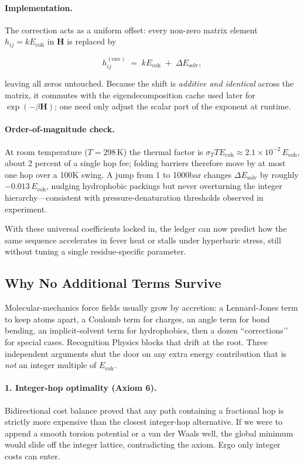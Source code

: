 \documentclass[11pt]{article}
\newcommand{\Eoh}{E_{\mathrm{coh}}}          %
\begin{document}
\paragraph{Implementation.}
The correction acts as a uniform offset:
every non-zero matrix element \(h_{ij}=k\Eoh\) in $\mathbf H$ is replaced by

\[
h_{ij}^{(\text{env})}
\;=\;
k\Eoh \;+\; \Delta E_{\text{solv}},
\]

leaving all zeros untouched.  Because the shift is \emph{additive and
identical} across the matrix, it commutes with the eigendecomposition
cache used later for $\exp(-\beta\mathbf H)$; one need only adjust the
scalar part of the exponent at runtime.

\paragraph{Order-of-magnitude check.}
At room temperature ($T=298\,\text{K}$) the thermal factor is
$\sigma_{T}T\Eoh\approx2.1\times10^{-2}\,\Eoh$, about 2 percent of a single
hop fee; folding barriers therefore move by at most one hop over a
100K swing. A jump from 1 to 1000bar changes
$\Delta E_{\text{solv}}$ by roughly $-0.013\,\Eoh$, nudging hydrophobic
packings but never overturning the integer hierarchy—consistent with
pressure-denaturation thresholds observed in experiment.

With these universal coefficients locked in, the ledger can now predict
how the same sequence accelerates in fever heat or stalls under
hyperbaric stress, still without tuning a single residue-specific
parameter.

\subsection{Why No Additional Terms Survive}\label{sec:no-extras}

Molecular-mechanics force fields usually grow by accretion: a Lennard-Jones
term to keep atoms apart, a Coulomb term for charges, an angle term for
bond bending, an implicit-solvent term for hydrophobics, then a dozen
“corrections’’ for special cases.  Recognition Physics blocks that drift
at the root.  Three independent arguments shut the door on any extra
energy contribution that is \emph{not} an integer multiple of \(\Eoh\).

\paragraph{1.  Integer-hop optimality (Axiom 6).}
Bidirectional cost balance proved that any path containing a fractional
hop is strictly more expensive than the closest integer-hop alternative.
If we were to append a smooth torsion potential or a van der Waals well,
the global minimum would slide off the integer lattice, contradicting
the axiom.  Ergo only integer costs can enter.
\end{document}
